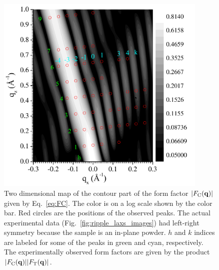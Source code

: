 \begin{figure}[htbp]
  \centering
  \includegraphics[width=0.9\textwidth]{figures/ripple/model/FT}
  \caption[Two dimensional map of $\FC$]
  {Two dimensional map of the contour part of the form factor $|F_\mathrm{C}(\mathbf{q})|$ given by
  Eq.~\ref{eq:FC}. The color is on a log scale shown by the color bar.
  Red circles are the positions of the observed peaks. The actual
  experimental data (Fig.~\ref{fig:ripple_laxs_images}) had left-right symmetry 
  because the sample is an in-plane powder.
  $h$ and $k$ indices are labeled for some of the peaks in green and cyan,
  respectively. The experimentally observed form factors are given by 
  the product $|F_\mathrm{C}(\mathbf{q})||F_\mathrm{T}(\mathbf{q})|$.}
  \label{fig:FC}
\end{figure}

